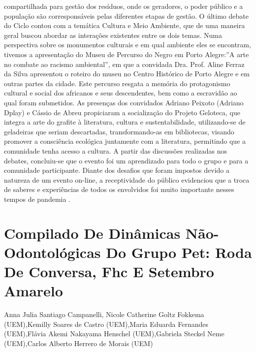 compartilhada para gestão dos resíduos, onde os geradores, o poder público e a população são
corresponsáveis pelas diferentes etapas de gestão.
O último debate do Ciclo contou com a temática Cultura e Meio Ambiente, que de uma
maneira geral buscou abordar as interações existentes entre os dois temas. Numa perspectiva
sobre os monumentos culturais e em qual ambiente eles se encontram, tivemos a apresentação do
Museu de Percurso do Negro em Porto Alegre:”A arte no combate ao racismo ambiental”, em
que a convidada Dra. Prof. Aline Ferraz da Silva apresentou o roteiro do museu no Centro
Histórico de Porto Alegre e em outras partes da cidade. Este percurso resgata a memória do
protagonismo cultural e social dos africanos e seus descendentes, bem como a escravidão ao qual
foram submetidos. As presenças dos convidados Adriano Peixoto (Adriano Dplay) e Cássio de
Abreu propiciaram a socialização do Projeto Geloteca, que integra a arte do grafite à literatura,
cultura e sustentabilidade, utilizando-se de geladeiras que seriam descartadas, transformando-as
em bibliotecas, visando promover a consciência ecológica juntamente com a literatura,
permitindo que a comunidade tenha acesso a cultura.
A partir das discussões realizadas nos debates, concluiu-se que o evento foi um
aprendizado para todo o grupo e para a comunidade participante. Diante dos desafios que foram
impostos devido a natureza de um evento on-line, a receptividade do público evidenciou que a
troca de saberes e experiências de todos os envolvidos foi muito importante nesses tempos de
pandemia .




\section*{Compilado De Dinâmicas Não-Odontológicas Do Grupo Pet: Roda De Conversa, Fhc E Setembro Amarelo}

Anna Julia Santiago Campanelli, Nicole Catherine Goltz Fokkema (UEM),Kemilly Soares de Castro (UEM),Maria Eduarda Fernandes (UEM),Flávia Akemi Nakayama Henschel (UEM),Gabriela Steckel Neme (UEM),Carlos Alberto Herrero de Morais (UEM)

